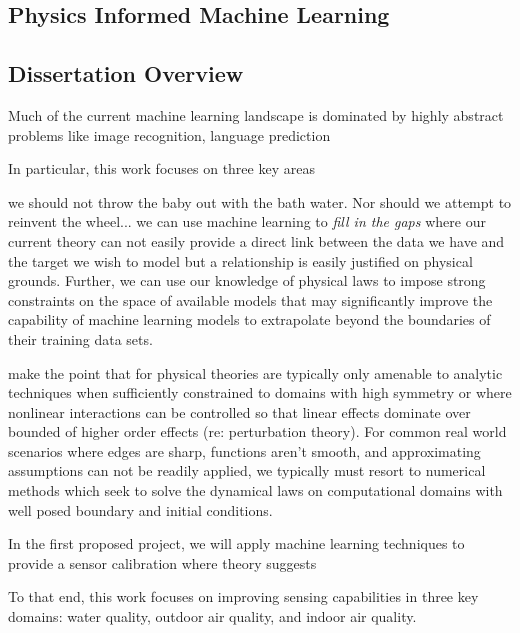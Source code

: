 \subsection{Physics Informed Machine Learning}

\subsection{Dissertation Overview}





Much of the current machine learning landscape is dominated by highly abstract problems like image recognition, language prediction

In particular, this work focuses on three key areas

we should not throw the baby out with the bath water. Nor should we attempt to reinvent the wheel... we can use machine learning to \textit{fill in the gaps} where our current theory can not easily provide a direct link between the data we have and the target we wish to model but a relationship is easily justified on physical grounds. Further, we can use our knowledge of physical laws to impose strong constraints on the space of available models that may significantly improve the capability of machine learning models to extrapolate beyond the boundaries of their training data sets. 

make the point that for physical theories are typically only amenable to analytic techniques when sufficiently constrained to domains with high symmetry or where nonlinear interactions can be controlled so that linear effects dominate over bounded of higher order effects (re: perturbation theory). For common real world scenarios where edges are sharp, functions aren't smooth, and approximating assumptions can not be readily applied, we typically must resort to numerical methods which seek to solve the dynamical laws on computational domains with well posed boundary and initial conditions.

In the first proposed project, we will apply machine learning techniques to provide a sensor calibration where theory suggests


To that end, this work focuses on improving sensing capabilities in three key domains: water quality, outdoor air quality, and indoor air quality.





